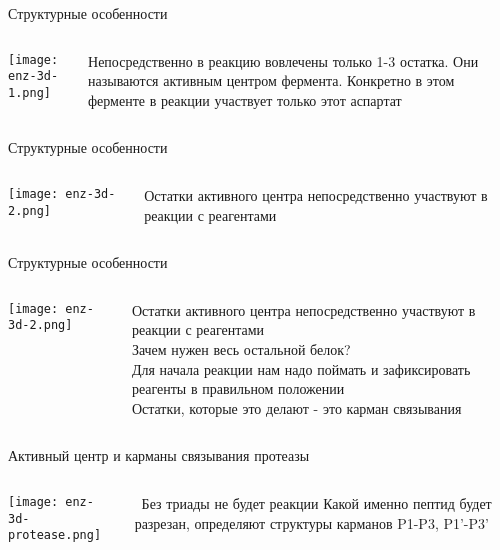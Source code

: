 \begin{frame}{Структурные особенности}
\begin{columns}
\begin{column}{0.5\textwidth}
    \texttt{[image: enz-3d-1.png]}
\end{column}
\begin{column}{0.5\textwidth}
    Непосредственно в реакцию вовлечены только 1-3 остатка. Они называются активным центром фермента.
    \newline
   Конкретно в этом ферменте в реакции участвует только этот аспартат
\end{column}
\end{columns}
\end{frame}

\begin{frame}{Структурные особенности}
\begin{columns}
\begin{column}{0.5\textwidth}
    \texttt{[image: enz-3d-2.png]}
\end{column}
\begin{column}{0.5\textwidth}
    Остатки активного центра непосредственно участвуют в реакции с реагентами
\end{column}
\end{columns}
\end{frame}


\begin{frame}{Структурные особенности}
\begin{columns}
\begin{column}{0.5\textwidth}
    \texttt{[image: enz-3d-2.png]}
\end{column}
\begin{column}{0.5\textwidth}
    Остатки активного центра непосредственно участвуют в реакции с реагентами\\
    Зачем нужен весь остальной белок?\\
    \vspace{1cm}
Для начала реакции нам надо поймать 
и зафиксировать реагенты в правильном положении \\

Остатки, которые это делают - это карман связывания
\end{column}
\end{columns}
\end{frame}
 


\begin{frame}{Активный центр и карманы связывания протеазы}
\begin{columns}
\begin{column}{0.5\textwidth}
    \texttt{[image: enz-3d-protease.png]}
\end{column}
\begin{column}{0.5\textwidth}\
    Без триады не будет реакции
Какой именно пептид будет разрезан, определяют структуры карманов P1-P3, P1’-P3’
\end{column}
\end{columns}
\end{frame}


